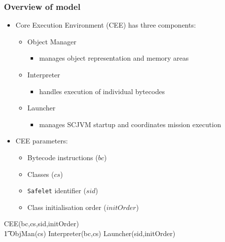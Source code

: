 \documentclass{beamer}
\begin{document}
\begin{frame}
  \frametitle{Overview of model}
  \begin{itemize}
  \item Core Execution Environment (CEE) has three components:
    \begin{itemize}
    \item Object Manager
      \begin{itemize}
      \item manages object representation and memory areas
      \end{itemize}
    \item Interpreter 
      \begin{itemize}
      \item handles execution of individual bytecodes
      \end{itemize}
    \item Launcher
      \begin{itemize}
      \item manages SCJVM startup and coordinates mission execution
      \end{itemize}
    \end{itemize}
  \item CEE parameters:
    \begin{itemize}
    \item Bytecode instructions ($bc$)
    \item Classes ($cs$)
    \item \texttt{Safelet} identifier ($sid$)
    \item Class initialisation order ($initOrder$)
    \end{itemize}
  \end{itemize}
  \vspace{-0.8cm}
  {\setlength{\zedindent}{2mm}
    \setlength{\zedleftsep}{2mm}
    \setlength{\zedtab}{0.7em}
    \begin{circus}
      \circprocess CEE(bc,cs,sid,initOrder) \circdef \\
      \t1 ObjMan(cs) \parallel Interpreter(bc,cs)  \parallel Launcher(sid,initOrder)
    \end{circus}}
\end{frame}
\end{document}
